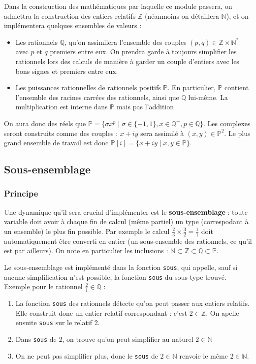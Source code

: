 \documentclass[french]{article}
\newcommand{\p}{\texttt} %
\begin{document}
Dans la construction des mathématiques par laquelle ce module passera, on admettra la construction des entiers relatifs $\mathbb{Z}$ (néanmoins on détaillera $\mathbb{N}$), et on implémentera quelques ensembles de valeurs :
\begin{itemize}
    \item Les rationnels $\mathbb{Q}$, qu'on assimilera l'ensemble des couples $(p, q) \in \mathbb{Z} \times \mathbb{N}^*$ avec $p$ et $q$ premiers entre eux. On prendra garde à toujours simplifier les rationnels lors des calculs de manière à garder un couple d'entiers avec les bons signes et premiers entre eux.
    \item Les puissances rationnelles de rationnels positifs $\mathbb{P}$. En particulier, $\mathbb{P}$ contient l'ensemble des racines carrées des rationnels, ainsi que $\mathbb{Q}$ lui-même. La multiplication est interne dans $\mathbb{P}$ mais pas l'addition
\end{itemize}

On aura donc des réels que $\mathbb{P} = \{\sigma x^p \mid \sigma \in \{-1, 1\}, x \in \mathbb{Q}^+, p \in \mathbb{Q}\}$. Les complexes seront construits comme des couples : $x + iy$ sera assimilé à $(x, y) \in \mathbb{P}^2$. Le plus grand ensemble de travail est donc $\mathbb{P}[i] = \{x + iy \mid x, y \in \mathbb{P}\}$.

\subsection{Sous-ensemblage}

\subsubsection{Principe}

Une dynamique qu'il sera crucial d'implémenter est le \textbf{sous-ensemblage} : toute variable doit avoir à chaque fin de calcul (même partiel) un type (correspodant à un ensemble) le plus fin possible. Par exemple le calcul $\frac{2}{3} \times \frac{3}{2} = \frac{1}{1}$ doit automatiquement être converti en entier (un sous-ensemble des rationnels, ce qu'il est par ailleurs). On note en particulier les inclusions : $\mathbb{N} \subset \mathbb{Z} \subset \mathbb{Q} \subset \mathbb{P}$.

Le sous-ensemblage est implémenté dans la fonction \p{sous}, qui appelle, sauf si aucune simplification n'est possible, la fonction \p{sous} du sous-type trouvé.
Exemple pour le rationnel $\frac{2}{1} \in \mathbb{Q}$ :
\begin{enumerate}
  \item La fonction \p{sous} des rationnels détecte qu'on peut passer aux entiers relatifs. Elle construit donc un entier relatif correspondant : c'est $2 \in \mathbb{Z}$. On apelle ensuite \p{sous} sur le relatif 2.
  \item Dans \p{sous} de 2, on trouve qu'on peut simplifier au naturel $2 \in \mathbb{N}$
  \item On ne peut pas simplifier plus, donc le \p{sous} de $2 \in \mathbb{N}$ renvoie le même $2 \in \mathbb{N}$.
\end{enumerate}
\end{document}
